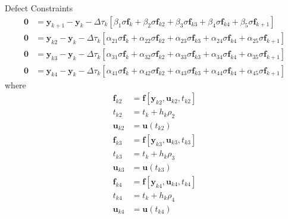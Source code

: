 \documentclass[]{article}
\begin{document}
\noindent Defect Constraints 
\begin{align}
    \mathbf{0} &= \mathbf{y}_{k+1} - \mathbf{y}_k - \Delta\tau_k\left[\beta_1\sigma\mathbf{f}_k + \beta_2\sigma\mathbf{f}_{k2} + \beta_3\sigma\mathbf{f}_{k3} + \beta_4\sigma\mathbf{f}_{k4} + \beta_5\sigma\mathbf{f}_{k+1}\right] \\ 
    \mathbf{0} &= \mathbf{y}_{k2} - \mathbf{y}_k - \Delta\tau_k\left[\alpha_{21}\sigma\mathbf{f}_k + \alpha_{22}\sigma\mathbf{f}_{k2} + \alpha_{23}\sigma\mathbf{f}_{k3} + \alpha_{24}\sigma\mathbf{f}_{k4} + \alpha_{25}\sigma\mathbf{f}_{k+1}\right] \\ 
    \mathbf{0} &= \mathbf{y}_{k3} - \mathbf{y}_k - \Delta\tau_k\left[\alpha_{31}\sigma\mathbf{f}_k + \alpha_{32}\sigma\mathbf{f}_{k2} + \alpha_{33}\sigma\mathbf{f}_{k3} + \alpha_{34}\sigma\mathbf{f}_{k4} + \alpha_{35}\sigma\mathbf{f}_{k+1}\right] \\ 
    \mathbf{0} &= \mathbf{y}_{k4} - \mathbf{y}_k - \Delta\tau_k\left[\alpha_{41}\sigma\mathbf{f}_k + \alpha_{42}\sigma\mathbf{f}_{k2} + \alpha_{43}\sigma\mathbf{f}_{k3} + \alpha_{44}\sigma\mathbf{f}_{k4} + \alpha_{45}\sigma\mathbf{f}_{k+1}\right]
\end{align}
where
\begin{align}
    \mathbf{f}_{k2} &= \mathbf{f}\left[\mathbf{y}_{k2},\mathbf{u}_{k2},t_{k2}\right] \\ 
    t_{k2} &= t_k + h_k\rho_2 \\ 
    \mathbf{u}_{k2} &= \mathbf{u}(t_{k2}) \\ 
    \mathbf{f}_{k3} &= \mathbf{f}\left[\mathbf{y}_{k3},\mathbf{u}_{k3},t_{k3}\right] \\ 
    t_{k3} &= t_k + h_k\rho_3 \\ 
    \mathbf{u}_{k3} &= \mathbf{u}(t_{k3}) \\ 
    \mathbf{f}_{k4} &= \mathbf{f}\left[\mathbf{y}_{k4},\mathbf{u}_{k4},t_{k4}\right] \\ 
    t_{k4} &= t_k + h_k\rho_4 \\ 
    \mathbf{u}_{k4} &= \mathbf{u}(t_{k4}) 
\end{align}
\vspace{2mm}
\end{document}
